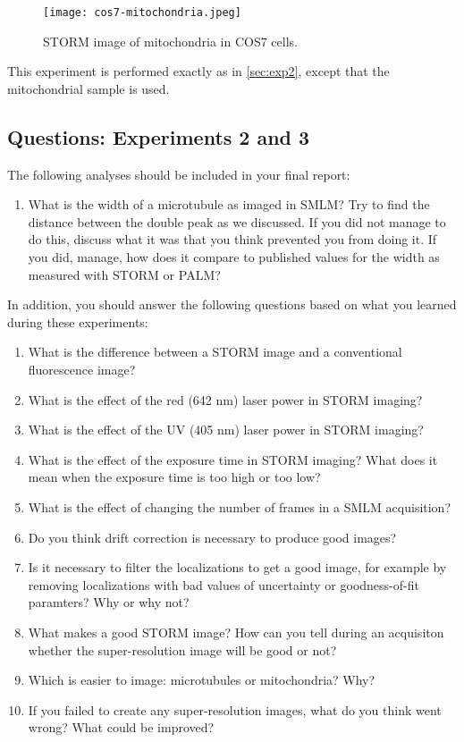 \documentclass[10pt,a4paper,oneside]{book}
\begin{document}
\begin{figure}[ht]
    \centering
    \texttt{[image: cos7-mitochondria.jpeg]}
    \caption{STORM image of mitochondria in COS7 cells.}
    \label{fig:cos7-mitochondria}
\end{figure}

This experiment is performed exactly as in \autoref{sec:exp2}, except that the mitochondrial sample is used.

\subsection{Questions: Experiments 2 and 3}\label{sec:questions}

The following analyses should be included in your final report:

\begin{enumerate}
    \item What is the width of a microtubule as imaged in SMLM? Try to find the distance between the double peak as we discussed. If you did not manage to do this, discuss what it was that you think prevented you from doing it. If you did, manage, how does it compare to published values for the width as measured with STORM or PALM?
\end{enumerate}

In addition, you should answer the following questions based on what you learned during these experiments:

\begin{enumerate}
    \item{What is the difference between a STORM image and a conventional fluorescence image?}
    \item{What is the effect of the red (642 nm) laser power in STORM imaging?}
    \item{What is the effect of the UV (405 nm) laser power in STORM imaging?}
    \item{What is the effect of the exposure time in STORM imaging? What does it mean when the exposure time is too high or too low?}
    \item{What is the effect of changing the number of frames in a SMLM acquisition?}
    \item{Do you think drift correction is necessary to produce good images?}
    \item{Is it necessary to filter the localizations to get a good image, for example by removing localizations with bad values of uncertainty or goodness-of-fit paramters? Why or why not?}
    \item{What makes a good STORM image? How can you tell during an acquisiton whether the super-resolution image will be good or not?}
    \item{Which is easier to image: microtubules or mitochondria? Why?}
    \item{If you failed to create any super-resolution images, what do you think went wrong? What could be improved?}
\end{enumerate}
\end{document}

